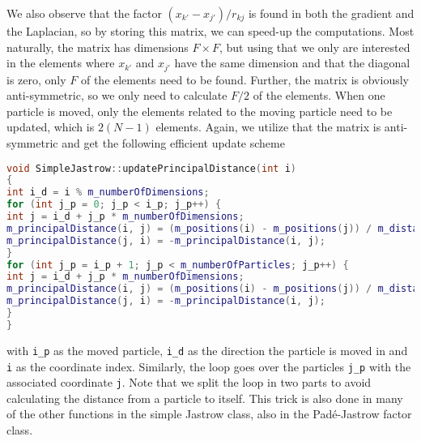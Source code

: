 We also observe that the factor $(x_{k'}-x_{j'})/r_{kj}$ is found in both the gradient and the Laplacian, so by storing this matrix, we can speed-up the computations. Most naturally, the matrix has dimensions $F\times F$, but using that we only are interested in the elements where $x_{k'}$ and $x_{j'}$ have the same dimension and that the diagonal is zero, only $F$ of the elements need to be found. Further, the matrix is obviously anti-symmetric, so we only need to calculate $F/2$ of the elements. When one particle is moved, only the elements related to the moving particle need to be updated, which is $2(N-1)$ elements. Again, we utilize that the matrix is anti-symmetric and get the following efficient update scheme
\begin{lstlisting}[language={c++}]
void SimpleJastrow::updatePrincipalDistance(int i)
{
int i_d = i % m_numberOfDimensions;
for (int j_p = 0; j_p < i_p; j_p++) {
int j = i_d + j_p * m_numberOfDimensions;
m_principalDistance(i, j) = (m_positions(i) - m_positions(j)) / m_distanceMatrix(i_p, j_p);
m_principalDistance(j, i) = -m_principalDistance(i, j);
}
for (int j_p = i_p + 1; j_p < m_numberOfParticles; j_p++) {
int j = i_d + j_p * m_numberOfDimensions;
m_principalDistance(i, j) = (m_positions(i) - m_positions(j)) / m_distanceMatrix(i_p, j_p);
m_principalDistance(j, i) = -m_principalDistance(i, j);
}
}
\end{lstlisting}
with \lstinline{i_p} as the moved particle, \lstinline{i_d} as the direction the particle is moved in and \lstinline|i| as the coordinate index. Similarly, the loop goes over the particles \lstinline{j_p} with the associated coordinate \lstinline{j}. Note that we split the loop in two parts to avoid calculating the distance from a particle to itself. This trick is also done in many of the other functions in the simple Jastrow class, also in the Padé-Jastrow factor class. 

